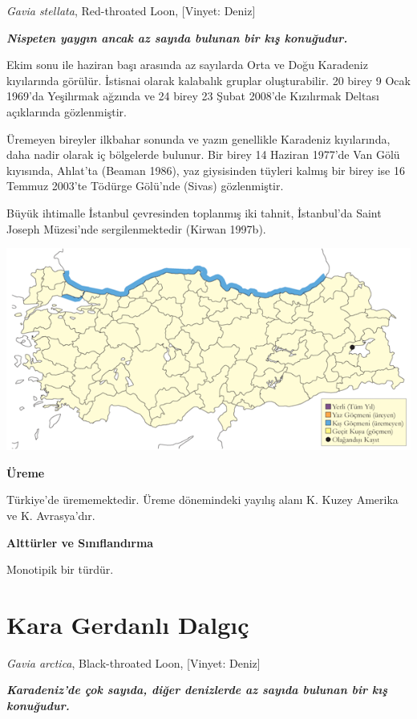 \documentclass[
  letterpaper,
  DIV=11,
  numbers=noendperiod]{scrreprt}
\begin{document}
\emph{Gavia stellata}, Red-throated Loon, {[}Vinyet: Deniz{]}

\textbf{\emph{Nispeten yaygın ancak az sayıda bulunan bir kış
konuğudur.}}

Ekim sonu ile haziran başı arasında az sayılarda Orta ve Doğu Karadeniz
kıyılarında görülür. İstisnai olarak kalabalık gruplar oluşturabilir. 20
birey 9 Ocak 1969'da Yeşilırmak ağzında ve 24 birey 23 Şubat 2008'de
Kızılırmak Deltası açıklarında gözlenmiştir.

Üremeyen bireyler ilkbahar sonunda ve yazın genellikle Karadeniz
kıyılarında, daha nadir olarak iç bölgelerde bulunur. Bir birey 14
Haziran 1977'de Van Gölü kıyısında, Ahlat'ta (Beaman 1986), yaz
giysisinden tüyleri kalmış bir birey ise 16 Temmuz 2003'te Tödürge
Gölü'nde (Sivas) gözlenmiştir.

Büyük ihtimalle İstanbul çevresinden toplanmış iki tahnit, İstanbul'da
Saint Joseph Müzesi'nde sergilenmektedir (Kirwan 1997b).

\includegraphics{images/harita_Page_045.png}

\textbf{Üreme}

Türkiye'de ürememektedir. Üreme dönemindeki yayılış alanı K. Kuzey
Amerika ve K. Avrasya'dır.

\textbf{Alttürler ve Sınıflandırma}

Monotipik bir türdür.

\section{Kara Gerdanlı Dalgıç}\label{kara-gerdanlux131-dalgux131uxe7}

\emph{Gavia arctica}, Black-throated Loon, {[}Vinyet: Deniz{]}

\textbf{\emph{Karadeniz'de çok sayıda, diğer denizlerde az sayıda
bulunan bir kış konuğudur.}}
\end{document}
